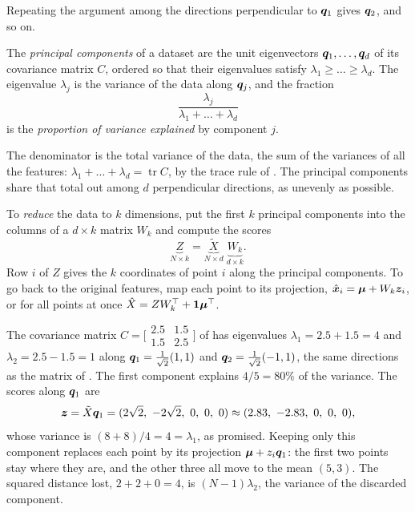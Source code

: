 Repeating the argument among the directions perpendicular to $\bm{q}_1$
gives $\bm{q}_2$, and so on.

\begin{definition}
  \label{def:pca}
  The \emph{principal components} of a dataset are the unit eigenvectors
  $\bm{q}_1, \dots, \bm{q}_d$ of its covariance matrix $C$, ordered so
  that their eigenvalues satisfy $\lambda_1 \ge \dots \ge \lambda_d$. The
  eigenvalue $\lambda_j$ is the variance of the data along $\bm{q}_j$,
  and the fraction
  \[
    \frac{\lambda_j}{\lambda_1 + \dots + \lambda_d}
  \]
  is the \emph{proportion of variance explained} by component $j$.
\end{definition}

The denominator is the total variance of the data, the sum of the
variances of all the features: $\lambda_1 + \dots + \lambda_d =
\operatorname{tr} C$, by the trace rule of
. The principal components share that total
out among $d$ perpendicular directions, as unevenly as possible.

To \emph{reduce} the data to $k$ dimensions, put the first $k$ principal
components into the columns of a $d \times k$ matrix $W_k$ and compute the
scores
\[
  \underbrace{Z}_{N \times k}
  = \underbrace{\tilde{X}}_{N \times d} \; \underbrace{W_k}_{d \times k} .
\]
Row $i$ of $Z$ gives the $k$ coordinates of point $i$ along the principal
components. To go back to the original features, map each point to its
projection, $\hat{\bm{x}}_i = \bm{\mu} + W_k \bm{z}_i$, or for all
points at once $\hat{X} = Z W_k^\top + \mathbf{1}\bm{\mu}^\top$.

\begin{example}
  \label{ex:ch04-pca}
  The covariance matrix $C = \bigl[\begin{smallmatrix} 2.5 & 1.5 \\ 1.5 &
  2.5 \end{smallmatrix}\bigr]$ of  has eigenvalues
  $\lambda_1 = 2.5 + 1.5 = 4$ and
  $\lambda_2 = 2.5 - 1.5 = 1$ along $\bm{q}_1 = \frac{1}{\sqrt2}(1, 1)$
  and $\bm{q}_2 = \frac{1}{\sqrt2}(-1, 1)$, the same directions as the
  matrix of . The first component explains
  $4 / 5 = 80\%$ of the variance. The scores along $\bm{q}_1$ are
  \[
    \bm{z} = \tilde{X}\bm{q}_1
    = (2\sqrt2,\ -2\sqrt2,\ 0,\ 0,\ 0)
    \approx (2.83,\ -2.83,\ 0,\ 0,\ 0),
  \]
  whose variance is $(8 + 8)/4 = 4 = \lambda_1$, as promised. Keeping
  only this component replaces each point by its projection
  $\bm{\mu} + z_i \bm{q}_1$: the first two points stay where they are,
  and the other three all move to the mean $(5, 3)$. The squared distance
  lost, $2 + 2 + 0 = 4$, is $(N - 1)\lambda_2$, the variance of the
  discarded component.
\end{example}

